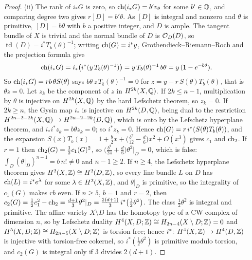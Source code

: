 \begin{proof}
(ii) The rank of $i_{*}G$ is zero, so $\operatorname{ch}(i_{*}G)=b'v_{\theta}$ for some
$b'\in\mathbb{Q}$, and comparing degree two gives $r[D]=b'\theta$. As $[D]$ is
integral and nonzero and $\theta$ is primitive, $[D]=b\theta$ with $b$ a
positive integer, and $D$ is ample. The tangent bundle of $X$ is trivial and
the normal bundle of $D$ is $\mathcal{O}_{D}(D)$, so $\operatorname{td}(D)=
i^{*}T_{b}(\theta)^{-1}$; writing $\operatorname{ch}(G)=i^{*}y$, Grothendieck--Riemann--Roch
and the projection formula give
\[
  \operatorname{ch}(i_{*}G)=i_{*}\bigl(i^{*}(y\,T_{b}(\theta)^{-1})\bigr)
  =y\,T_{b}(\theta)^{-1}\,b\theta=y\,(1-e^{-b\theta}).
\]
So $\operatorname{ch}(i_{*}G)=rb\,\theta S(\theta)$ says $b\theta\,z\,T_{b}(\theta)^{-1}=0$ for
$z=y-r\,S(\theta)T_{b}(\theta)$, that is $\theta z=0$. Let $z_{k}$ be the
component of $z$ in $H^{2k}(X,\mathbb{Q})$. If $2k\le n-1$, multiplication by
$\theta$ is injective on $H^{2k}(X,\mathbb{Q})$ by the hard Lefschetz theorem, so
$z_{k}=0$. If $2k\ge n$, the Gysin map $i_{*}$ is injective on
$H^{2k}(D,\mathbb{Q})$, being dual to the restriction
$H^{2n-2-2k}(X,\mathbb{Q})\to H^{2n-2-2k}(D,\mathbb{Q})$, which is onto by the Lefschetz
hyperplane theorem, and $i_{*}i^{*}z_{k}=b\theta z_{k}=0$; so $i^{*}z_{k}=0$.
Hence $\operatorname{ch}(G)=r\,i^{*}(S(\theta)T_{b}(\theta))$, and the expansion
$S(x)T_{b}(x)=1+\frac b2x+\bigl(\frac{b^{2}}{12}-\frac d6\bigr)x^{2}+O(x^{3})$
gives $c_{1}$ and $\operatorname{ch}_{2}$. If $r=1$ then $\operatorname{ch}_{2}(G)=\frac12c_{1}(G)^{2}$, so
$\bigl(\frac{b^{2}}{24}+\frac d6\bigr)\theta^{2}|_{D}=0$, which is false: $\int_{D}
(\theta|_{D})^{n-1}=b\,n!\ne0$ and $n-1\ge2$. If $n\ge4$, the Lefschetz
hyperplane theorem gives $H^{2}(X,\mathbb{Z})\cong H^{2}(D,\mathbb{Z})$, so every line bundle
$L$ on $D$ has $\operatorname{ch}(L)=i^{*}e^{\lambda}$ for some $\lambda\in H^{2}(X,\mathbb{Z})$, and
$\theta|_{D}$ is primitive, so the integrality of $c_{1}(G)$ makes $rb$ even.
If $n\ge5$, $b=1$ and $r=2$, then $c_{2}(G)=\frac12c_{1}^{2}-\operatorname{ch}_{2}=
\frac{d+1}{3}\theta^{2}|_{D}=\frac{2(d+1)}{3}\,i^{*}\bigl(\tfrac12\theta^{2}\bigr)$.
The class $\frac12\theta^{2}$ is integral and primitive. The affine variety
$X\setminus D$ has the homotopy type of a CW complex of dimension $n$, so by
Lefschetz duality $H^{4}(X,D;\mathbb{Z})\cong H_{2n-4}(X\setminus D;\mathbb{Z})=0$ and
$H^{5}(X,D;\mathbb{Z})\cong H_{2n-5}(X\setminus D;\mathbb{Z})$ is torsion free; hence
$i^{*}\colon H^{4}(X,\mathbb{Z})\to H^{4}(D,\mathbb{Z})$ is injective with torsion-free
cokernel, so $i^{*}(\frac12\theta^{2})$ is primitive modulo torsion, and
$c_{2}(G)$ is integral only if $3$ divides $2(d+1)$.


\end{proof}
